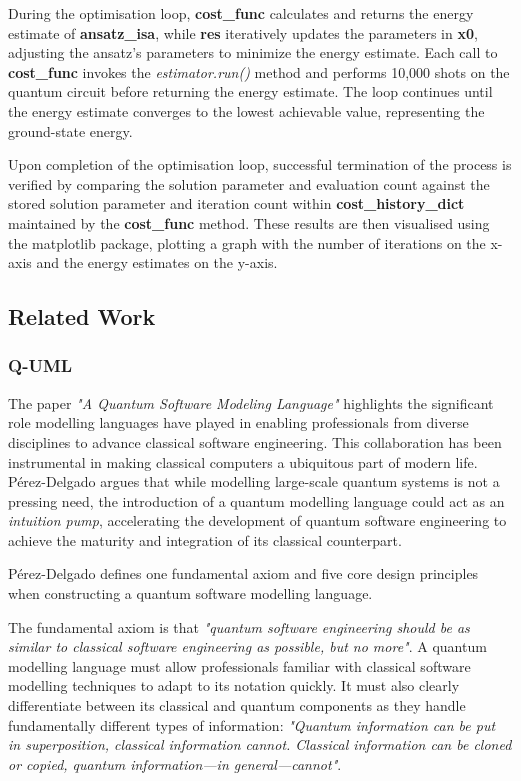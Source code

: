 \documentclass{article}
\begin{document}
{During the optimisation loop, \textbf{cost\_func} calculates and returns the energy estimate of \textbf{ansatz\_isa}, while \textbf{res} iteratively updates the parameters in \textbf{x0}, adjusting the ansatz's parameters to minimize the energy estimate. Each call to \textbf{cost\_func} invokes the \textit{estimator.run()} method and performs 10,000 shots on the quantum circuit before returning the energy estimate. The loop continues until the energy estimate converges to the lowest achievable value, representing the ground-state energy\cite{Tutorial}.

Upon completion of the optimisation loop, successful termination of the process is verified by comparing the solution parameter and evaluation count against the stored solution parameter and iteration count within \textbf{cost\_history\_dict} maintained by the \textbf{cost\_func} method. These results are then visualised using the matplotlib package, plotting a graph with the number of iterations on the x-axis and the energy estimates on the y-axis.

\subsection{Related Work}

\subsubsection{Q-UML}

The paper \textit{"A Quantum Software Modeling Language"} highlights the significant role modelling languages have played in enabling professionals from diverse disciplines to advance classical software engineering. This collaboration has been instrumental in making classical computers a ubiquitous part of modern life. Pérez-Delgado argues that while modelling large-scale quantum systems is not a pressing need, the introduction of a quantum modelling language could act as an \textit{intuition pump}, accelerating the development of quantum software engineering to achieve the maturity and integration of its classical counterpart\cite{Pérez-Delgado2022}.

Pérez-Delgado defines one fundamental axiom and five core design principles when constructing a quantum software modelling language. 

The fundamental axiom is that \textit{"quantum software
engineering should be as similar to classical software engineering as possible, but no more"}\cite{Pérez-Delgado2022}. A quantum modelling language must allow professionals familiar with classical software modelling techniques to adapt to its notation quickly. It must also clearly differentiate between its classical and quantum components as they handle fundamentally different types of information: \textit{"Quantum information can be put in superposition, classical information
cannot. Classical information can be cloned or copied, quantum information—in
general—cannot"}\cite{Pérez-Delgado2022}.

}
\end{document}
